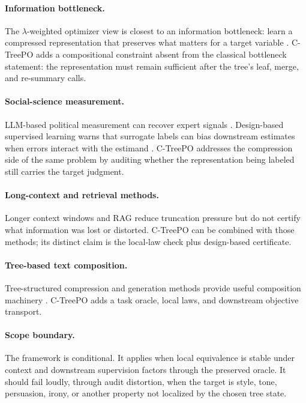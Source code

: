 \paragraph{Information bottleneck.}
The $\lambda$-weighted optimizer view is closest to an information bottleneck:
learn a compressed representation that preserves what matters for a target
variable \citep{TishbyPereiraBialek1999}. C-TreePO adds a compositional
constraint absent from the classical bottleneck statement: the representation
must remain sufficient after the tree's leaf, merge, and re-summary calls.

\paragraph{Social-science measurement.}
LLM-based political measurement can recover expert signals
\citep{BenoitEtAl2025}. Design-based supervised learning warns that surrogate
labels can bias downstream estimates when errors interact with the estimand
\citep{EgamiEtAl2024}. C-TreePO addresses the compression side of the same
problem by auditing whether the representation being labeled still carries the
target judgment.

\paragraph{Long-context and retrieval methods.}
Longer context windows and RAG reduce truncation pressure but do not certify
what information was lost or distorted. C-TreePO can be combined with those
methods; its distinct claim is the local-law check plus design-based
certificate.

\paragraph{Tree-based text composition.}
Tree-structured compression and generation methods provide useful composition
machinery
\citep{KnightMarcu2000SentenceCompression,BarzilayMcKeown2005SentenceFusion,ClarkeLapata2008ILPSentenceCompression,KuznetsovaEtAl2014TreeTalk}.
C-TreePO adds a task oracle, local laws, and downstream objective transport.

\paragraph{Scope boundary.}
The framework is conditional. It applies when local equivalence is stable under
context and downstream supervision factors through the preserved oracle. It
should fail loudly, through audit distortion, when the target is style, tone,
persuasion, irony, or another property not localized by the chosen tree state.
